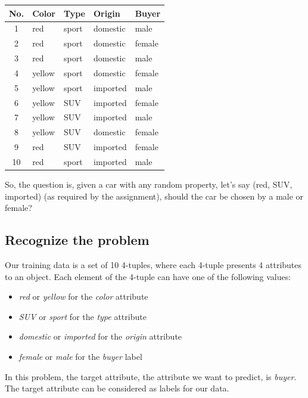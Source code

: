 \documentclass[a4paper]{article}
\begin{document}
		\begin{table}[H]
			\centering
			\begin{tabular}{@{}cllll@{}} 
				\toprule
				No.& Color  & Type  & Origin   & Buyer \\
				\midrule
				1  & red    & sport & domestic & male \\ 
				2  & red    & sport & domestic & female \\
				3  & red    & sport & domestic & male \\
				4  & yellow & sport & domestic & female \\
				5  & yellow & sport & imported & male \\
				6  & yellow & SUV   & imported & female \\
				7  & yellow & SUV   & imported & male \\
				8  & yellow & SUV   & domestic & female \\
				9  & red    & SUV   & imported & female \\
				10 & red    & sport & imported & male \\
				\bottomrule
			\end{tabular}
		\end{table}

		So, the question is, given a car with any random property, let's
		say (red, SUV, imported) (as required by the assignment), should
		the car be chosen by a male or female?

	\subsection{Recognize the problem}

		Our training data is a set of 10 4-tuples, where each 4-tuple presents 4
		attributes to an object. Each element of the 4-tuple can have one of the
		following values:
		\begin{itemize}
			\item \textit{red} or \textit{yellow} for the \textit{color} attribute
			\item \textit{SUV} or \textit{sport} for the \textit{type} attribute
			\item \textit{domestic} or \textit{imported} for the \textit{origin} attribute
			\item \textit{female} or \textit{male} for the \textit{buyer} label
		\end{itemize}

		In this problem, the target attribute, the attribute we want to predict, is
		\textit{buyer}. The target attribute can be considered as labels for our data.
\end{document}
